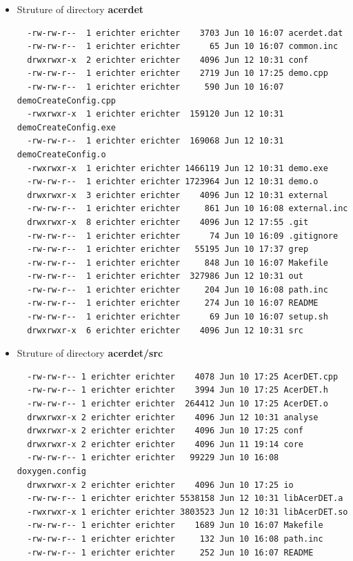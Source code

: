 \begin{itemize}
\item
Struture of directory {\bf acerdet}
{\scriptsize
\begin{verbatim}  
  -rw-rw-r--  1 erichter erichter    3703 Jun 10 16:07 acerdet.dat
  -rw-rw-r--  1 erichter erichter      65 Jun 10 16:07 common.inc
  drwxrwxr-x  2 erichter erichter    4096 Jun 12 10:31 conf
  -rw-rw-r--  1 erichter erichter    2719 Jun 10 17:25 demo.cpp
  -rw-rw-r--  1 erichter erichter     590 Jun 10 16:07 demoCreateConfig.cpp
  -rwxrwxr-x  1 erichter erichter  159120 Jun 12 10:31 demoCreateConfig.exe
  -rw-rw-r--  1 erichter erichter  169068 Jun 12 10:31 demoCreateConfig.o
  -rwxrwxr-x  1 erichter erichter 1466119 Jun 12 10:31 demo.exe
  -rw-rw-r--  1 erichter erichter 1723964 Jun 12 10:31 demo.o
  drwxrwxr-x  3 erichter erichter    4096 Jun 12 10:31 external
  -rw-rw-r--  1 erichter erichter     861 Jun 10 16:08 external.inc
  drwxrwxr-x  8 erichter erichter    4096 Jun 12 17:55 .git
  -rw-rw-r--  1 erichter erichter      74 Jun 10 16:09 .gitignore
  -rw-rw-r--  1 erichter erichter   55195 Jun 10 17:37 grep
  -rw-rw-r--  1 erichter erichter     848 Jun 10 16:07 Makefile
  -rw-rw-r--  1 erichter erichter  327986 Jun 12 10:31 out
  -rw-rw-r--  1 erichter erichter     204 Jun 10 16:08 path.inc
  -rw-rw-r--  1 erichter erichter     274 Jun 10 16:07 README
  -rw-rw-r--  1 erichter erichter      69 Jun 10 16:07 setup.sh
  drwxrwxr-x  6 erichter erichter    4096 Jun 12 10:31 src
\end{verbatim} 
}
\item
Struture of directory {\bf acerdet/src}
{\scriptsize
\begin{verbatim}  
  -rw-rw-r-- 1 erichter erichter    4078 Jun 10 17:25 AcerDET.cpp
  -rw-rw-r-- 1 erichter erichter    3994 Jun 10 17:25 AcerDET.h
  -rw-rw-r-- 1 erichter erichter  264412 Jun 10 17:25 AcerDET.o
  drwxrwxr-x 2 erichter erichter    4096 Jun 12 10:31 analyse
  drwxrwxr-x 2 erichter erichter    4096 Jun 10 17:25 conf
  drwxrwxr-x 2 erichter erichter    4096 Jun 11 19:14 core
  -rw-rw-r-- 1 erichter erichter   99229 Jun 10 16:08 doxygen.config
  drwxrwxr-x 2 erichter erichter    4096 Jun 10 17:25 io
  -rw-rw-r-- 1 erichter erichter 5538158 Jun 12 10:31 libAcerDET.a
  -rwxrwxr-x 1 erichter erichter 3803523 Jun 12 10:31 libAcerDET.so
  -rw-rw-r-- 1 erichter erichter    1689 Jun 10 16:07 Makefile
  -rw-rw-r-- 1 erichter erichter     132 Jun 10 16:08 path.inc
  -rw-rw-r-- 1 erichter erichter     252 Jun 10 16:07 README
\end{verbatim} 
}
\end{itemize}


